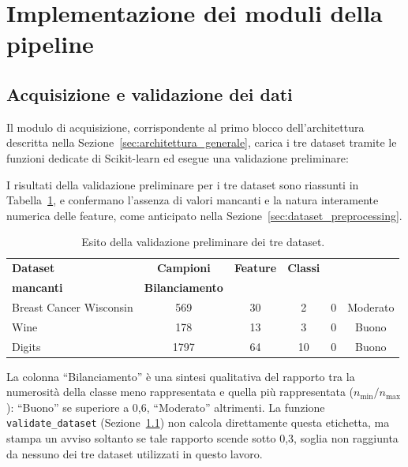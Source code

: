 \section{Implementazione dei moduli della pipeline}
\label{sec:implementazione_moduli}

\subsection{Acquisizione e validazione dei dati}
\label{sec:impl_acquisizione}

Il modulo di acquisizione, corrispondente al primo blocco dell'architettura descritta nella Sezione~\ref{sec:architettura_generale}, carica i tre dataset tramite le funzioni dedicate di Scikit-learn ed esegue una validazione preliminare:



I risultati della validazione preliminare per i tre dataset sono riassunti in Tabella~\ref{tab:validazione_dataset}, e confermano l'assenza di valori mancanti e la natura interamente numerica delle feature, come anticipato nella Sezione~\ref{sec:dataset_preprocessing}.

\begin{table}[htbp]
\centering
\caption{Esito della validazione preliminare dei tre dataset.}
\label{tab:validazione_dataset}
\small
\setlength{\tabcolsep}{4pt}
\begin{tabular}{lccccc}
\toprule
\textbf{Dataset} & \textbf{Campioni} & \textbf{Feature} & \textbf{Classi} & \shortstack{\textbf{Valori}\\\textbf{mancanti}} & \textbf{Bilanciamento} \\
\midrule
Breast Cancer Wisconsin & 569 & 30 & 2 & 0 & Moderato \\
Wine & 178 & 13 & 3 & 0 & Buono \\
Digits & 1797 & 64 & 10 & 0 & Buono \\
\bottomrule
\end{tabular}

\medskip
{\footnotesize La colonna ``Bilanciamento'' è una sintesi qualitativa del rapporto tra la numerosità della classe meno rappresentata e quella più rappresentata ($n_{\min}/n_{\max}$): ``Buono'' se superiore a 0,6, ``Moderato'' altrimenti. La funzione \texttt{validate\_dataset} (Sezione~\ref{sec:impl_acquisizione}) non calcola direttamente questa etichetta, ma stampa un avviso soltanto se tale rapporto scende sotto 0,3, soglia non raggiunta da nessuno dei tre dataset utilizzati in questo lavoro.}
\end{table}

